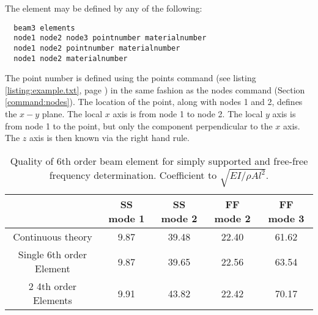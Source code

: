 \documentclass[12pt]{article}
\newcommand*{\command}[1]{\textsf{#1}}
\newcommand{\lstref}[1]{(see listing \ref{listing:#1}, page
  \pageref{listing:#1})}
\begin{document}
The element may be defined by any of the following:\\
\begin{lstlisting}
  beam3 elements
  node1 node2 node3 pointnumber materialnumber
  node1 node2 pointnumber materialnumber
  node1 node2 materialnumber
\end{lstlisting}
The point number is defined using the \command{points} command
\lstref{example.txt} in the same fashion as the \command{nodes}
command (Section \ref{command:nodes}). The location of the point,
along with nodes 1 and 2, defines the $x-y$ plane. The local $x$ axis
is from node 1 to node 2. The local $y$ axis is from node 1 to the
point, but only the component perpendicular to the $x$ axis. The $z$
axis is then known via the right hand rule.

\begin{table}
\begin{tabular}[h]{|c|c|c|c|c|}
\hline
 &
SS mode 1&
SS mode 2 &
FF mode 2 &
FF mode 3
\\ \hline
Continuous theory &
9.87 &
39.48 &
22.40 &
61.62
\\ \hline
Single 6th order Element &
9.87 &
39.65 &
22.56 &
63.54
\\ \hline
2 4th order Elements &
9.91 &
43.82 &
22.42 &
70.17
\\ \hline
\end{tabular}
\caption{Quality of 6th order beam element for simply supported and free-free frequency determination. Coefficient to $\sqrt{EI/\rho A l^{2}}$.}
\end{table}
\end{document}
